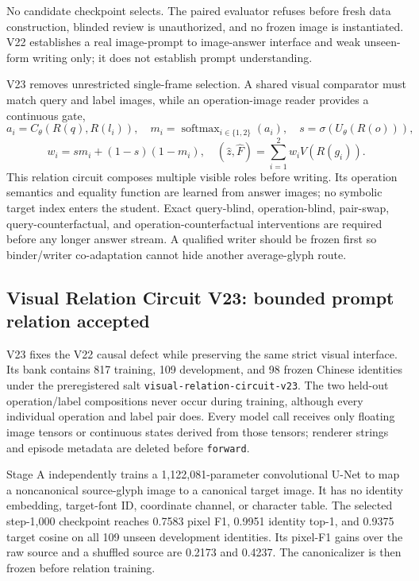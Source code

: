 \documentclass[11pt]{article}
\begin{document}
No candidate checkpoint selects. The paired evaluator refuses before fresh
data construction, blinded review is unauthorized, and no frozen image is
instantiated. V22 establishes a real image-prompt to image-answer interface and
weak unseen-form writing only; it does not establish prompt understanding.

V23 removes unrestricted single-frame selection. A shared visual
comparator must match query and label images, while an operation-image reader
provides a continuous gate,
\[
a_i=C_\theta(R(q),R(l_i)),\quad
m_i=\operatorname{softmax}_{i\in\{1,2\}}(a_i),\quad
s=\sigma(U_\theta(R(o))),
\]
\[
w_i=s m_i+(1-s)(1-m_i),\quad
(\hat z,\hat F)=\sum_{i=1}^{2}w_i V(R(g_i)).
\]
This relation circuit composes multiple visible roles before writing. Its
operation semantics and equality function are learned from answer images; no
symbolic target index enters the student. Exact query-blind, operation-blind,
pair-swap, query-counterfactual, and operation-counterfactual interventions are
required before any longer answer stream. A qualified writer should be frozen
first so binder/writer co-adaptation cannot hide another average-glyph route.

\subsection{Visual Relation Circuit V23: bounded prompt relation accepted}

V23 fixes the V22 causal defect while preserving the same strict visual
interface. Its bank contains 817 training, 109 development, and 98 frozen
Chinese identities under the preregistered salt
\texttt{visual-relation-circuit-v23}. The two held-out operation/label
compositions never occur during training, although every individual operation
and label pair does. Every model call receives only floating image tensors or
continuous states derived from those tensors; renderer strings and episode
metadata are deleted before \texttt{forward}.

Stage A independently trains a 1,122,081-parameter convolutional U-Net to map a
noncanonical source-glyph image to a canonical target image. It has no identity
embedding, target-font ID, coordinate channel, or character table. The selected
step-1,000 checkpoint reaches 0.7583 pixel F1, 0.9951 identity top-1, and 0.9375
target cosine on all 109 unseen development identities. Its pixel-F1 gains over
the raw source and a shuffled source are 0.2173 and 0.4237. The canonicalizer is
then frozen before relation training.
\end{document}
